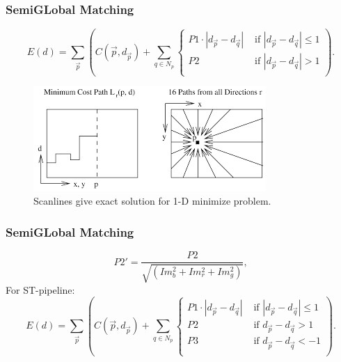 \documentclass[11pt]{beamer}
\begin{document}
\begin{frame}
\frametitle{SemiGLobal Matching}
\begin{equation}\label{eq:global_sgm_cont}
E(d) = \sum_{\vec p} \left(C(\vec{p}, d_{\vec p}) + \sum_{q\in N_p} 
\begin{cases}
P1\cdot |d_{\vec p} - d_{\vec q}|  & \text{ if }|d_{\vec p} - d_{\vec q}| \leq 1\\
P2 & \text{ if }|d_{\vec p} - d_{\vec q}| > 1\\
\end{cases}  
\right).
\end{equation}
\begin{figure}
	\centering
	\includegraphics[width=0.7\linewidth]{images/sgm_paths}
	\caption[Discrete scanline to continuous scanline]{Scanlines give exact solution for 1-D minimize problem.}
	\label{fig:discretecont}
\end{figure}

\end{frame}

\begin{frame}
\frametitle{SemiGLobal Matching}
\begin{equation}\label{key}
P2' =  \frac{P2}{\sqrt{(Im_b^2 +Im_r^2 + Im_g^2)}},
\end{equation}
For ST-pipeline:
\begin{equation}\label{eq:global_sgm_cont_occlusion}
E(d) = \sum_{\vec p} \left(C(\vec{p}, d_{\vec p}) + \sum_{q\in N_p} 
\begin{cases}
P1\cdot |d_{\vec p} - d_{\vec q}|  & \text{ if }|d_{\vec p} - d_{\vec q}| \leq 1\\
P2 & \text{ if }d_{\vec p} - d_{\vec q} > 1\\
P3 & \text{ if }d_{\vec p} - d_{\vec q} < -1\\
\end{cases}  
\right).
\end{equation}
\end{frame}
\end{document}
